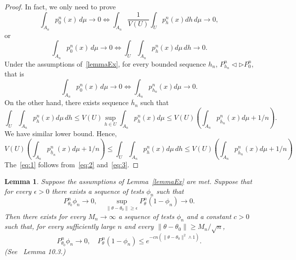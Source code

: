 \documentclass[3p]{elsarticle}
\newtheorem{lemma}{Lemma}
\begin{document}
\begin{proof}
In fact, we only need to prove
\begin{equation}
\int_{A_n}p_0^n(x)\, d\mu \to 0 \Leftrightarrow \int_{A_n}\frac{1}{V(U)}\int_U p_h^n(x) dh \, d\mu \to 0,
\end{equation}
or
\begin{equation}\label{eq:1}
\int_{A_n}p_0^n(x)\, d\mu \to 0 \Leftrightarrow \int_{U}\int_{A_n} p_h^n(x) d\mu \, dh \to 0.
\end{equation}
Under the assumptions of~\ref{lemmaEx}, for every bounded sequence $h_n$, $P_{h_n}^n\triangleleft \triangleright P_{0}^n$, that is
\begin{equation}\label{eq:2}
\int_{A_n}p_0^n(x)\, d\mu \to 0 \Leftrightarrow \int_{A_n} p_{h_n}^n(x) d\mu  \to 0.
\end{equation}
On the other hand, there exists sequence $\overline{h}_n$ such that
\begin{equation}
\int_{U}\int_{A_n} p_h^n(x) d\mu \, dh
\leq V(U)\sup_{h\in U}\int_{A_n} p_h^n(x) d\mu
\leq V(U)(\int_{A_n}p^n_{\overline{h}_n}(x)d\mu +1/n).
\end{equation}
 We have similar lower bound. Hence,
\begin{equation}\label{eq:3}
 V(U)(\int_{A_n}p^n_{\underline{h}_n}(x)d\mu +1/n)
\leq \int_{U}\int_{A_n} p_h^n(x) d\mu \, dh
\leq V(U)(\int_{A_n}p^n_{\overline{h}_n}(x)d\mu +1/n)
\end{equation}
The~\eqref{eq:1} follows from~\eqref{eq:2} and~\eqref{eq:3}.
\end{proof}

\begin{lemma}\label{lemmaTest}
    Suppose the assumptions of Lemma~\ref{lemmaEx} are met. Suppose that for every $\epsilon>0$ there exists a sequence of tests $\phi_n$ such that
$$
P_{\theta_0}^n \phi_n \to 0,\quad \sup_{\|\theta-\theta_0\|\geq \epsilon}P_{\theta}^n (1-\phi_n)\to 0.
$$
Then there exists for every $M_n\to \infty$ a sequence of tests $\phi_n$ and a constant $c>0$ such that, for every sufficiently large $n$ and every $\|\theta-\theta_0\|\geq M_n /\sqrt{n}$,
$$
P_{\theta_0}^n\phi_n \to 0, \quad P_\theta^n (1-\phi_n)\leq e^{-cn(\|\theta-\theta_0\|^2\wedge 1)}.
$$
    (See~\cite{van2000asymptotic} Lemma 10.3.)
\end{lemma}
\end{document}
